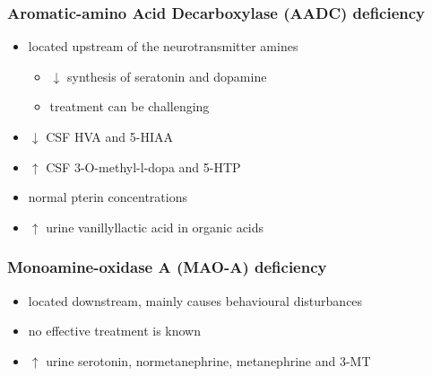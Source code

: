 \documentclass[12pt]{scrartcl}
\begin{document}
\subsubsection{Aromatic-amino Acid Decarboxylase (AADC) deficiency}
\label{sec:org8a28115}
\begin{itemize}
\item located upstream of the neurotransmitter amines
\begin{itemize}
\item \(\downarrow\) synthesis of seratonin and dopamine
\item treatment can be challenging
\end{itemize}
\item \(\downarrow\) CSF HVA and 5-HIAA
\item \(\uparrow\) CSF 3-O-methyl-l-dopa and 5-HTP
\item normal pterin concentrations
\item \(\uparrow\) urine vanillyllactic acid in organic acids
\end{itemize}
\subsubsection{Monoamine-oxidase A (MAO-A) deficiency}
\label{sec:org7087377}
\begin{itemize}
\item located downstream, mainly causes behavioural disturbances
\item no effective treatment is known
\item \(\uparrow\) urine serotonin, normetanephrine, metanephrine and 3-MT
\end{itemize}
\end{document}
